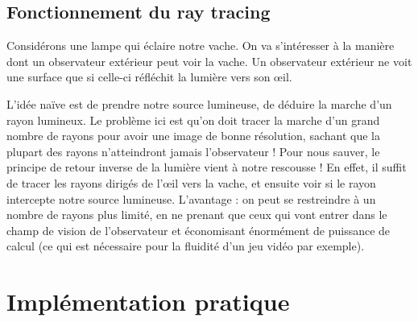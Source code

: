 \documentclass{classe}
\begin{document}
\subsection{Fonctionnement du ray tracing}
Considérons une lampe qui éclaire notre vache. On va s'intéresser à la manière dont un observateur extérieur peut voir la vache.
Un observateur extérieur ne voit une surface que si celle-ci réfléchit la lumière vers son \oe il.

L'idée naïve est de prendre notre source lumineuse, de déduire la marche d'un rayon lumineux.
Le problème ici est qu'on doit tracer la marche d'un grand nombre de rayons pour avoir une image de bonne résolution, sachant que la plupart des rayons n'atteindront jamais l'observateur !
Pour nous sauver, le principe de retour inverse de la lumière vient à notre rescousse ! En effet, il suffit de tracer les rayons dirigés de l'\oe il vers la vache, et ensuite voir si le rayon intercepte notre source lumineuse.
L'avantage : on peut se restreindre à un nombre de rayons plus limité, en ne prenant que ceux qui vont entrer dans le champ de vision de l'observateur et économisant énormément de puissance de calcul (ce qui est nécessaire pour la fluidité d'un jeu vidéo par exemple).

\section{Implémentation pratique}
\end{document}
